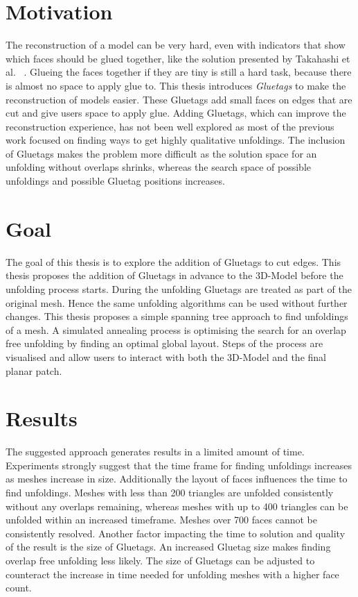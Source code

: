 \documentclass[draft,final]{vutinfth} %
\begin{document}
\section{Motivation}
The reconstruction of a model can be very hard, even with indicators that show which faces should be glued together, like the solution presented by Takahashi et al.
~\cite{takahashi2011optimized}. Glueing the faces together if they are tiny is still a hard task, because there is almost no space to apply glue to.
This thesis introduces \textit{Gluetags} to make the reconstruction of models easier. These Gluetags add small faces on edges that are cut and give users space to apply glue. Adding Gluetags, which can improve the reconstruction experience, has not been well explored as most of the previous work focused on finding ways to get highly qualitative unfoldings. The inclusion of Gluetags makes the problem more difficult as the solution space for an unfolding without overlaps shrinks, whereas the search space of possible unfoldings and possible Gluetag positions increases.

\section{Goal}
The goal of this thesis is to explore the addition of Gluetags to cut edges. This thesis proposes the addition of Gluetags in advance to the 3D-Model before the unfolding process starts. During the unfolding Gluetags are treated as part of the original mesh. Hence the same unfolding algorithms can be used without further changes. This thesis proposes a simple spanning tree approach to find unfoldings of a mesh. A simulated annealing process is optimising the search for an overlap free unfolding by finding an optimal global layout. Steps of the process are visualised and allow users to interact with both the 3D-Model and the final planar patch.

\section{Results}
The suggested approach generates results in a limited amount of time. Experiments strongly suggest that the time frame for finding unfoldings increases as meshes increase in size. Additionally the layout of faces influences the time to find unfoldings. Meshes with less than 200 triangles are unfolded consistently without any overlaps remaining, whereas meshes with up to 400 triangles can be unfolded within an increased timeframe. Meshes over 700 faces cannot be consistently resolved. Another factor impacting the time to solution and quality of the result is the size of Gluetags. An increased Gluetag size makes finding overlap free unfolding less likely. The size of Gluetags can be adjusted to counteract the increase in time needed for unfolding meshes with a higher face count.
\end{document}
